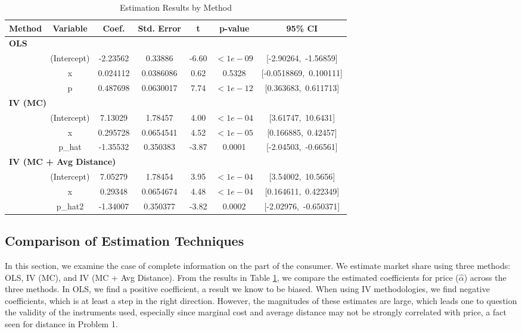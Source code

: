 \documentclass{article}
\begin{document}
\begin{table}[htbp]
\centering
\caption{Estimation Results by Method}
\label{tab:methods_combined}
\begin{tabular}{lcccccc}
\hline\hline
\textbf{Method} & \textbf{Variable} & \textbf{Coef.} & \textbf{Std. Error} & \textbf{t} & \textbf{p-value} & \textbf{95\% CI} \\
\hline
\multicolumn{7}{l}{\textbf{OLS}} \\
& (Intercept) & -2.23562 & 0.33886 & -6.60 & $<1e{-}09$ & [-2.90264,\ -1.56859] \\
& x           & 0.024112 & 0.0386086 & 0.62 & 0.5328 & [-0.0518869,\ 0.100111] \\
& p           & 0.487698 & 0.0630017 & 7.74 & $<1e{-}12$ & [0.363683,\ 0.611713] \\
\hline
\multicolumn{7}{l}{\textbf{IV (MC)}} \\
& (Intercept) & 7.13029 & 1.78457 & 4.00 & $<1e{-}04$ & [3.61747,\ 10.6431] \\
& x           & 0.295728 & 0.0654541 & 4.52 & $<1e{-}05$ & [0.166885,\ 0.42457] \\
& p\_hat      & -1.35532 & 0.350383 & -3.87 & 0.0001 & [-2.04503,\ -0.66561] \\
\hline
\multicolumn{7}{l}{\textbf{IV (MC + Avg Distance)}} \\
& (Intercept) & 7.05279 & 1.78454 & 3.95 & $<1e{-}04$ & [3.54002,\ 10.5656] \\
& x           & 0.29348 & 0.0654674 & 4.48 & $<1e{-}04$ & [0.164611,\ 0.422349] \\
& p\_hat2     & -1.34007 & 0.350377 & -3.82 & 0.0002 & [-2.02976,\ -0.650371] \\
\hline\hline
\end{tabular}
\end{table}

\subsection*{Comparison of Estimation Techniques}

In this section, we examine the case of complete information on the part of the consumer. We estimate market share
using three methods: OLS, IV (MC), and IV (MC + Avg Distance). From the results in Table \ref{tab:methods_combined},
we compare the estimated coefficients for price ($\hat{\alpha}$) across the three methods. In OLS, we find a positive
coefficient, a result we know to be biased. When using IV methodologies, we find negative coefficients, which is 
at least a step in the right direction. However, the magnitudes of these estimates are large, which leads one
to question the validity of the instruments used, especially since marginal cost and average distance may not be
strongly correlated with price, a fact seen for distance in Problem 1.
\end{document}
